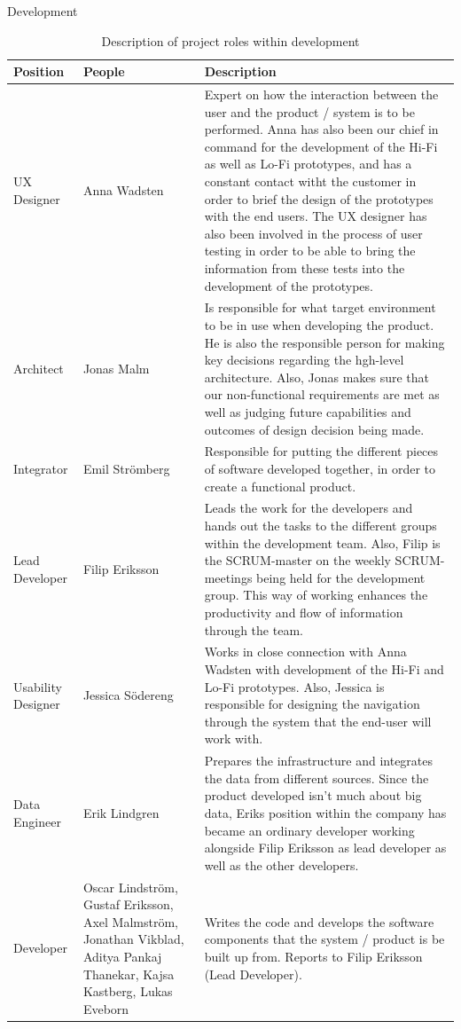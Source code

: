 \vspace{10cm}
\begin{table}[H]

\begin{center}
\begin{huge}
    Development
\end{huge}
\begin{tabular}{ | m{4cm} |m{3cm} |m{10cm}| } 
\hline
\textbf{Position} & \textbf{People} & \textbf{Description} \\ 
\hline
UX Designer & Anna Wadsten & Expert on how the interaction between the user and the product / system is to be performed. Anna has also been our chief in command for the development of the Hi-Fi as well as Lo-Fi prototypes, and has a constant contact witht the customer in order to brief the design of the prototypes with the end users. The UX designer has also been involved in the process of user testing in order to be able to bring the information from these tests into the development of the prototypes.  \\
\hline
Architect & Jonas Malm & Is responsible for what target environment to be in use when developing the product. He is also the responsible person for making key decisions regarding the hgh-level architecture. Also, Jonas makes sure that our non-functional requirements are met as well as judging future capabilities and outcomes of design decision being made.  \\
\hline
Integrator & Emil Strömberg & Responsible for putting the different pieces of software developed together, in order to create a functional product.  \\
\hline
Lead Developer & Filip Eriksson & Leads the work for the developers and hands out the tasks to the different groups within the development team. Also, Filip is the SCRUM-master on the weekly SCRUM-meetings being held for the development group. This way of working enhances the productivity and flow of information through the team. \\
\hline
Usability Designer & Jessica Södereng & Works in close connection with Anna Wadsten with development of the Hi-Fi and Lo-Fi prototypes. Also, Jessica is responsible for designing the navigation through the system that the end-user will work with. \\
\hline
Data Engineer & Erik Lindgren & Prepares the infrastructure and integrates the data from different sources. Since the product developed isn't much about big data, Eriks position within the company has became an ordinary developer working alongside Filip Eriksson as lead developer as well as the other developers. \\
\hline
Developer & Oscar Lindström, 
Gustaf Eriksson, 
Axel Malmström, Jonathan Vikblad, Aditya Pankaj Thanekar, Kajsa Kastberg, Lukas Eveborn   & Writes the code and develops the software components that the system / product is be built up from. Reports to Filip Eriksson (Lead Developer). \\
\hline
\end{tabular}

\end{center}
\caption{\label{tab:table-name}Description of project roles within development}

\end{table}
